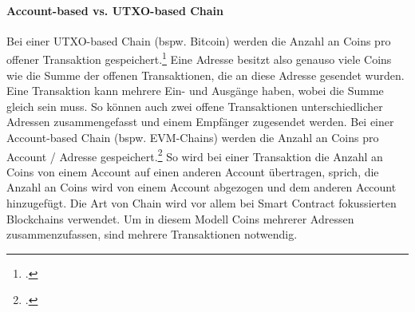 \paragraph{Account-based vs. UTXO-based Chain}
\label{sec:definition-account-based-vs-utxo-based-chain}
\noindent
Bei einer UTXO-based Chain (bspw. Bitcoin) werden die Anzahl an Coins pro offener Transaktion gespeichert.\footcite[Vgl. hierzu und zum Folgenden sowie weiterführend][S. 182 ff\adddot]{q5}
Eine Adresse besitzt also genauso viele Coins wie die Summe der offenen Transaktionen, die an diese Adresse gesendet wurden.
Eine Transaktion kann mehrere Ein- und Ausgänge haben, wobei die Summe gleich sein muss.
So können auch zwei offene Transaktionen unterschiedlicher Adressen zusammengefasst und einem Empfänger zugesendet werden.
\bigbreak
\noindent
Bei einer Account-based Chain (bspw. EVM-Chains) werden die Anzahl an Coins pro Account / Adresse gespeichert.\footcite[Vgl. hierzu und zum Folgenden][]{w16} 
So wird bei einer Transaktion die Anzahl an Coins von einem Account auf einen anderen Account übertragen, sprich, die Anzahl an Coins wird von einem Account abgezogen und dem anderen Account hinzugefügt.
Die Art von Chain wird vor allem bei Smart Contract fokussierten Blockchains verwendet.
Um in diesem Modell Coins mehrerer Adressen zusammenzufassen, sind mehrere Transaktionen notwendig.
